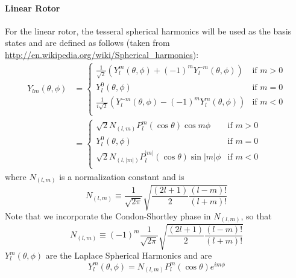 \documentclass{revtex4-1}
\begin{document}
\paragraph{Linear Rotor}\label{S:LinRotBS}
For the linear rotor, the tesseral spherical harmonics will be used as the basis states and are defined as follows (taken from \url{http://en.wikipedia.org/wiki/Spherical_harmonics}):
\begin{align}
Y_{lm}(\theta,\phi)&=\begin{cases}\label{E:SphDefComb} 	\frac{1}{\sqrt{2}}\left(Y^{m}_{l}\left(\theta,\phi\right)+\left(-1\right)^{m}Y^{-m}_{l}\left(\theta,\phi\right)\right) &\mbox{if } m>0\\
								 	Y^{0}_{l}\left(\theta,\phi\right) &\mbox{if } m=0\\
								 	\frac{1}{i\sqrt{2}}\left(Y^{-m}_{l}\left(\theta,\phi\right)-\left(-1\right)^{m}Y^{m}_{l}\left(\theta,\phi\right)\right) &\mbox{if } m<0\\
								 	\end{cases}\\
				   &=\begin{cases}\label{E:SphDefTes} 	\sqrt{2}N_{\left(l,m\right)}P^{m}_{l}\left(\cos{\theta}\right)\cos{m\phi} &\mbox{if } m>0\\
				   					Y^{0}_{l}\left(\theta,\phi\right) &\mbox{if } m=0\\
									\sqrt{2}N_{\left(l,|m|\right)}P^{|m|}_{l}\left(\cos{\theta}\right)\sin{|m|\phi} &\mbox{if } m<0\\
				   					\end{cases}
\end{align}
where $N_{\left(l,m\right)}$ is a normalization constant and is 
\begin{equation}
N_{\left(l,m\right)}\equiv\frac{1}{\sqrt{2\pi}}\sqrt{\frac{\left(2l+1\right)}{2}\frac{\left(l-m\right)!}{\left(l+m\right)!}}
\end{equation}
Note that we incorporate the Condon-Shortley phase in $N_{\left(l,m\right)}$, so that 
\begin{equation}
N_{\left(l,m\right)}\equiv\left(-1\right)^{m}\frac{1}{\sqrt{2\pi}}\sqrt{\frac{\left(2l+1\right)}{2}\frac{\left(l-m\right)!}{\left(l+m\right)!}}
\end{equation}
$Y^{m}_{l}\left(\theta,\phi\right)$ are the Laplace Spherical Harmonics and are  
\begin{equation}
Y^{m}_{l}\left(\theta,\phi\right)=N_{\left(l,m\right)}P^{m}_{l}\left(\cos{\theta}\right)e^{im\phi}
\end{equation}
\end{document}

